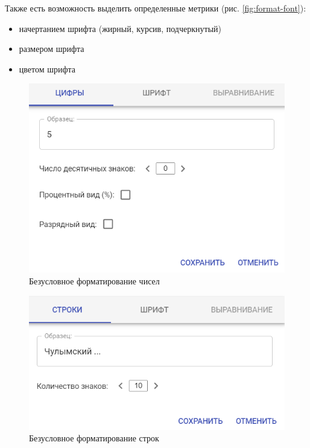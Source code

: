 \documentclass[../user-manual.tex]{subfiles}
\begin{document}
	Также есть возможность выделить определенные метрики (рис. \ref{fig:format-font}):
	\begin{itemize}
	
		\item начертанием шрифта (жирный, курсив, подчеркнутый)
	
		\item размером шрифта
	
		\item цветом шрифта
	\end{itemize}
	\begin{figure}[h!]
		\centering
		\includegraphics[width=\graphicswidth]{img/11-format-number.png}
		\caption{Безусловное форматирование чисел}
		\label{fig:format-number}
	\end{figure}
	\begin{figure}[h!]
		\centering
		\includegraphics[width=\graphicswidth]{img/12-format-string.png}
		\caption{Безусловное форматирование строк}
		\label{fig:format-string}
	\end{figure}
\end{document}
